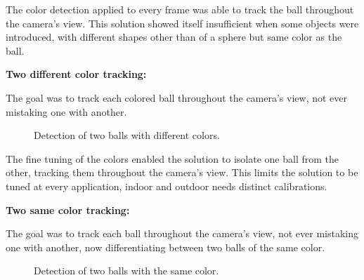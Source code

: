 \documentclass[10pt,twocolumn,letterpaper]{article}
\begin{document}
  The color detection applied to every frame was able to track the ball
  throughout the camera's view. This solution showed itself insufficient when
  some objects were introduced, with different shapes other than of a sphere but
  same color as the ball.

  \bigbreak{}
  \textbf{Two different color tracking:}
  \bigbreak{}

  The goal was to track each colored ball throughout the camera's view, not ever
  mistaking one with another.

  \begin{figure}[!h]
    \centering
    \setlength{\fboxsep}{1pt}
    \setlength{\fboxrule}{1pt}
    \caption{Detection of two balls with different colors.}\label{fig:diff_color}
  \end{figure}

  The fine tuning of the colors enabled the solution to isolate one ball from
  the other, tracking them throughout the camera's view. This limits the
  solution to be tuned at every application, indoor  and outdoor needs
  distinct calibrations.

  \bigbreak{}
  \textbf{Two same color tracking:}
  \bigbreak{}

  The goal was to track each ball throughout the camera's view, not ever
  mistaking one with another, now differentiating between two balls of the same
  color.

  \begin{figure}[!h]
    \centering
    \setlength{\fboxsep}{1pt}
    \setlength{\fboxrule}{1pt}
    \caption{Detection of two balls with the same color.}\label{fig:same_color}
  \end{figure}
\end{document}
